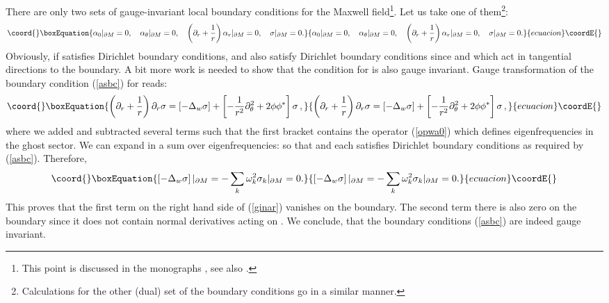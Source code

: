 \documentclass[a4paper,12pt]{article}
\begin{document}
There are only two sets of gauge-invariant local boundary conditions
for the Maxwell field\footnote{This point is discussed in the monographs
\cite{Gilkey:1995,EKP}, see also \cite{Vassilevich:1994cz}.
}. Let us take one of them\footnote{Calculations for the other (dual)
set of the boundary conditions go in a similar manner.}:
\begin{equation}\coord{}\boxEquation{
\alpha_0|_{\partial M}=0,\quad
\alpha_\theta |_{\partial M}=0,\quad
\left( \partial_r +\frac 1r \right) \alpha_r |_{\partial M}=0,\quad
\sigma |_{\partial M}=0.\label{asbc}
}{
\alpha_0|_{\partial M}=0,\quad
\alpha_\theta |_{\partial M}=0,\quad
\left( \partial_r +\frac 1r \right) \alpha_r |_{\partial M}=0,\quad
\sigma |_{\partial M}=0.}{ecuacion}\coordE{}\end{equation}
Obviously, if \myHighlight{$\sigma$}\coordHE{} satisfies Dirichlet boundary conditions,
\myHighlight{$\partial_0 \sigma$}\coordHE{} and \myHighlight{$\partial_\theta \sigma$}\coordHE{} also satisfy
Dirichlet boundary conditions since \coordHE{} and \myHighlight{$\partial_\theta$}\coordHE{}
which act in tangential directions to the boundary. 
A bit more work is needed to show that the
condition for \coordHE{} is also gauge invariant. 
Gauge transformation of the boundary condition (\ref{asbc})
for \coordHE{} reads:
\begin{equation}\coord{}\boxEquation{
\left( \partial_r +\frac 1r \right) \partial_r \sigma =
\left[ -\Delta_w \sigma \right] +
\left[ - \frac 1{r^2}\partial_\theta^2 + 2\phi\phi^* \right]\sigma
\,,\label{ginar}
}{
\left( \partial_r +\frac 1r \right) \partial_r \sigma =
\left[ -\Delta_w \sigma \right] +
\left[ - \frac 1{r^2}\partial_\theta^2 + 2\phi\phi^* \right]\sigma
\,,}{ecuacion}\coordE{}\end{equation}
where we added and subtracted several terms such that the first
bracket contains the operator (\ref{opwa0}) which defines eigenfrequencies
in the ghost sector. We can expand \myHighlight{$\sigma$}\coordHE{} in a sum over eigenfrequencies:
\coordHE{} so that 
\coordHE{} and each \coordHE{}
satisfies Dirichlet boundary conditions as required by (\ref{asbc}).
Therefore,
\begin{equation}\coord{}\boxEquation{
\left[ -\Delta_w \sigma \right]|_{\partial M} =
-\sum_k \omega_k^2 \sigma_k |_{\partial M} =0.\label{1stterm}
}{
\left[ -\Delta_w \sigma \right]|_{\partial M} =
-\sum_k \omega_k^2 \sigma_k |_{\partial M} =0.}{ecuacion}\coordE{}\end{equation}
This proves that the first term on the right hand side of (\ref{ginar})
vanishes on the boundary. The second term there is also zero on the
boundary since it does not contain normal derivatives acting on 
\myHighlight{$\sigma$}\coordHE{}. We conclude, that the boundary conditions (\ref{asbc})
are indeed gauge invariant. 
\end{document}
